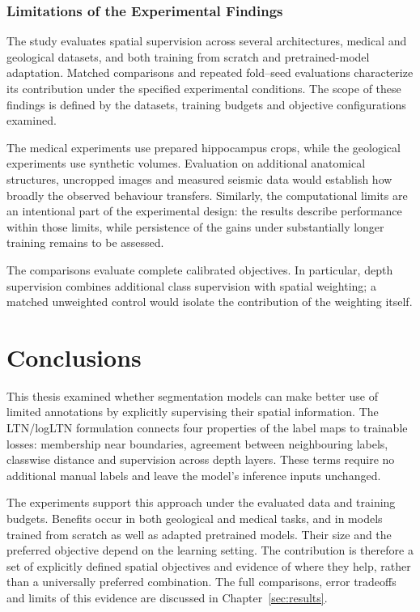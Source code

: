 \documentclass[12pt,a4paper]{article}
\begin{document}
\subsubsection{Limitations of the Experimental Findings}
\label{sec:experimental-limitations}

The study evaluates spatial supervision across several architectures,
medical and geological datasets, and both training from scratch and
pretrained-model adaptation. Matched comparisons and repeated fold--seed
evaluations characterize its contribution under the specified experimental
conditions. The scope of these findings is defined by the datasets,
training budgets and objective configurations examined.

The medical experiments use prepared hippocampus crops, while the
geological experiments use synthetic volumes. Evaluation on additional
anatomical structures, uncropped images and measured seismic data would
establish how broadly the observed behaviour transfers. Similarly, the
computational limits are an intentional part of the experimental design:
the results describe performance within those limits, while persistence
of the gains under substantially longer training remains to be assessed.

The comparisons evaluate complete calibrated objectives. In particular,
depth supervision combines additional class supervision with spatial
weighting; a matched unweighted control would isolate the contribution
of the weighting itself.


\clearpage

\section{Conclusions}\label{sec:conclusions}

This thesis examined whether segmentation models can make better use of
limited annotations by explicitly supervising their spatial information.
The LTN/logLTN formulation connects four properties of the label maps to
trainable losses: membership near boundaries, agreement between
neighbouring labels, classwise distance and supervision across depth
layers. These terms require no additional manual labels and leave the
model's inference inputs unchanged.

The experiments support this approach under the evaluated data and
training budgets. Benefits occur in both geological and medical tasks,
and in models trained from scratch as well as adapted pretrained models.
Their size and the preferred objective depend on the learning setting.
The contribution is therefore a set of explicitly defined spatial
objectives and evidence of where they help, rather than a universally
preferred combination. The full comparisons, error tradeoffs and limits
of this evidence are discussed in Chapter~\ref{sec:results}.
\end{document}
